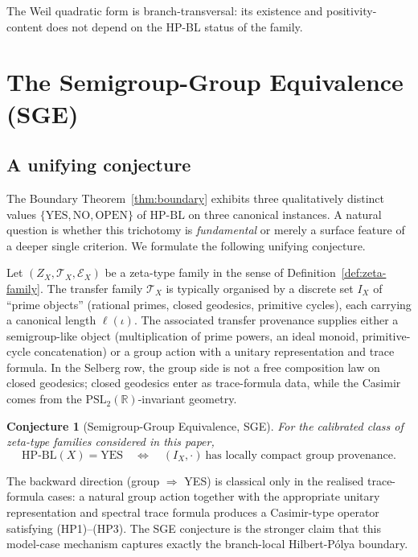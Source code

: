 \documentclass[11pt]{article}
\newtheorem{conjecture}[theorem]{Conjecture}
\theoremstyle{definition}
\theoremstyle{remark}
\newcommand{\HBL}{\mathrm{HP\text{-}BL}}
\newcommand{\PSL}{\mathrm{PSL}}
\begin{document}
The Weil quadratic form is branch-transversal: its existence and
positivity-content does not depend on the HP-BL status of the family.

\section{The Semigroup-Group Equivalence (SGE)}
\label{sec:sge-conjecture}

\subsection{A unifying conjecture}
\label{sec:sge-conjecture-statement}

The Boundary Theorem~\ref{thm:boundary} exhibits three qualitatively
distinct values $\{\mathrm{YES}, \mathrm{NO}, \mathrm{OPEN}\}$ of
$\HBL$ on three canonical instances. A natural question is whether
this trichotomy is \emph{fundamental} or merely a surface feature of
a deeper single criterion. We formulate the following unifying
conjecture.

Let $(Z_X, \mathcal{T}_X, \mathcal{E}_X)$ be a zeta-type family in
the sense of Definition~\ref{def:zeta-family}. The transfer family
$\mathcal{T}_X$ is typically organised by a discrete set $I_X$ of
``prime objects'' (rational primes, closed geodesics, primitive
cycles), each carrying a canonical length $\ell(\iota)$. The associated
transfer provenance supplies either a semigroup-like object
(multiplication of prime powers, an ideal monoid, primitive-cycle
concatenation) or a group action with a unitary representation and
trace formula. In the Selberg row, the group side is not a free
composition law on closed geodesics; closed geodesics enter as
trace-formula data, while the Casimir comes from the
$\PSL_2(\mathbb{R})$-invariant geometry.

\begin{conjecture}[Semigroup-Group Equivalence, SGE]
\label{conj:sge}
For the calibrated class of zeta-type families considered in this paper,
\[
  \HBL(X) = \mathrm{YES}
  \quad\Longleftrightarrow\quad
  (I_X, \cdot)\ \text{has locally compact group provenance}.
\]
\end{conjecture}

The backward direction (group $\Rightarrow$ YES) is classical only in
the realised trace-formula cases: a natural group action together with
the appropriate unitary representation and spectral trace formula
produces a Casimir-type operator satisfying (HP1)--(HP3). The SGE
conjecture is the stronger claim that this model-case mechanism
captures exactly the branch-local Hilbert-P\'olya boundary.
\end{document}
